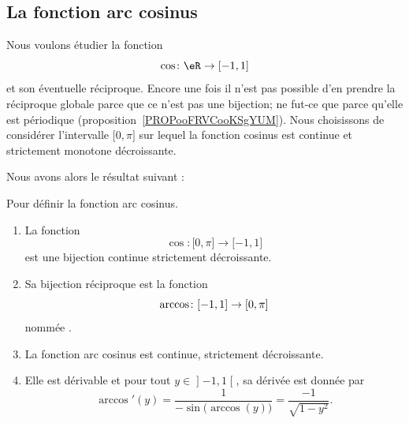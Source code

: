	\subsection{La fonction arc cosinus}

	Nous voulons étudier la fonction
	\begin{equation}
		\cos\colon \eR\to \mathopen[ -1 , 1 \mathclose]
	\end{equation}
	et son éventuelle réciproque. Encore une fois il n'est pas possible d'en prendre la réciproque globale parce que ce n'est pas une bijection; ne fut-ce que parce qu'elle est périodique (proposition~\ref{PROPooFRVCooKSgYUM}). Nous choisissons de considérer l'intervalle \( \mathopen[ 0 , \pi \mathclose]\) sur lequel la fonction cosinus est continue et strictement monotone décroissante.

	Nous avons alors le résultat suivant :

	\begin{propositionDef}     \label{PROPooZOZHooSMoYQD}
		Pour définir la fonction arc cosinus.

		\begin{enumerate}
			\item		\label{ITEMooMJWZooNHgQox}
			      La fonction
			      \begin{equation}
				      \cos\colon \mathopen[ 0 , \pi \mathclose]\to \mathopen[ -1 , 1 \mathclose]
			      \end{equation}
			      est une bijection continue strictement décroissante.
			\item
			      Sa bijection réciproque est la fonction
			      \begin{equation}
				      \arccos\colon \mathopen[ -1 , 1 \mathclose]\to \mathopen[ 0 , \pi \mathclose] \\
			      \end{equation}
			      nommée .
			\item
			      La fonction arc cosinus est continue, strictement décroissante.
			\item
			      Elle est dérivable et pour tout \( y\in\mathopen] -1 , 1 \mathclose[\), sa dérivée est donnée par
			      \begin{equation}
				      \arccos'(y)=\frac{1}{ -\sin\big( \arccos(y) \big) }=\frac{ -1 }{ \sqrt{1-y^2} }.
			      \end{equation}
		\end{enumerate}
	\end{propositionDef}

